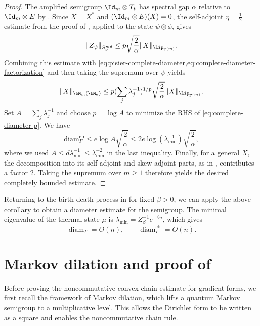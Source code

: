 \documentclass[sn-mathphys-num]{sn-jnl}
\begin{document}
\begin{proof}
The amplified semigroup $\Id_m\otimes T_t$ has spectral gap $\alpha$ relative
to $\Id_m\otimes E$ by . Since $X=X^*$ and
$(\Id_m\otimes E)(X)=0$, the self-adjoint $\eta=\frac12$ estimate from the
proof of , applied to the state
$\psi\otimes\phi$, gives
\[
  \|Z_\psi\|_{S_p^{md}}
  \le
  p\sqrt{\frac{2}{\alpha}}
  \|X\|_{\Lip_{\Gamma^{(m)}}}.
\]
Combining this estimate with \cref{eq:pisier-complete-diameter,eq:complete-diameter-factorization}
and then taking the supremum over $\psi$ yields
\begin{equation}\label{eq:complete-diameter-p}
  \|X\|_{\bM_m(\bM_d)}
  \le
  p(\sum_j\lambda_j^{-1})^{1/p}
  \sqrt{\frac{2}{\alpha}}
  \|X\|_{\Lip_{\Gamma^{(m)}}}.
\end{equation}
Set $A=\sum_j\lambda_j^{-1}$ and choose $p=\log A$ to minimize the RHS of \cref{eq:complete-diameter-p}. We have
\[
  \mathrm{diam}_{\Gamma}^{\mathrm{cb}}
  \le
  e\log A\sqrt{\frac{2}{\alpha}}
  \le
  2e\log(\lambda_{\min}^{-1})\sqrt{\frac{2}{\alpha}},
\]
where we used
$A\le d\lambda_{\min}^{-1}\le\lambda_{\min}^{-2}$ in the last inequality.
Finally, for a general $X$, the decomposition into its self-adjoint and
skew-adjoint parts, as in , contributes a factor
$2$. Taking the supremum over $m\ge1$ therefore yields the desired completely bounded estimate.
\end{proof}
Returning to the birth-death process in  for fixed $\beta>0$, we can apply the above corollary to obtain a diameter estimate for the semigroup. The minimal eigenvalue of the thermal state $\mu$ is $\lambda_{\min} = Z_\beta^{-1} e^{-\beta n}$, which gives
\[
  \operatorname{diam}_\Gamma=O(n),
  \qquad
  \operatorname{diam}_\Gamma^{\mathrm{cb}}=O(n).
\]



\appendix
{}

\section{Markov dilation and proof of \texorpdfstring{}{Prop}}\label{app:chain}
Before proving the noncommutative convex-chain estimate for gradient forms, we first
recall the framework of Markov dilation, which lifts a quantum Markov semigroup to a
multiplicative level.
This allows the Dirichlet form to be written as a square and enables the
noncommutative chain rule.
\end{document}
